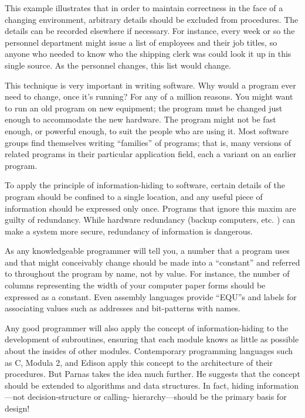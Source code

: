 This example illustrates that in order to maintain correctness in
the face of a changing environment, arbitrary details should be excluded
from procedures. The details can be recorded elsewhere if necessary.
For instance, every week or so the personnel department might issue
a list of employees and their job titles, so anyone who needed to
know who the shipping clerk was could look it up in this single source.
As the personnel changes, this list would change.

This technique is very important in writing software. Why would a
program ever need to change, once it's running? For any of a million
reasons. You might want to run an old program on new equipment; the
program must be changed just enough to accommodate the new hardware.
The program might not be fast enough, or powerful enough, to suit
the people who are using it. Most software groups find themselves
writing {}``families'' of programs; that is, many versions of related
programs in their particular application field, each a variant on
an earlier program. 

To apply the principle of information-hiding to software, certain
details of the program should be confined to a single location, and
any useful piece of information should be expressed only once. Programs
that ignore this maxim are guilty of redundancy. While hardware redundancy
(backup computers, etc. ) can make a system more secure, redundancy
of information is dangerous.

As any knowledgeable programmer will tell you, a number that a program
uses and that might conceivably change should be made into a {}``constant''
and referred to throughout the program by name, not by value. For
instance, the number of columns representing the width of your computer
paper forms should be expressed as a constant. Even assembly languages
provide {}``EQU''s and labels for associating values such as addresses
and bit-patterns with names.

Any good programmer will also apply the concept of information-hiding
to the development of subroutines, ensuring that each module knows
as little as possible about the insides of other modules. Contemporary
programming languages such as C, Modula 2, and Edison apply this concept
to the architecture of their procedures. But Parnas takes the idea
much further. He suggests that the concept should be extended to algorithms
and data structures. In fact, hiding information---not decision-structure
or calling- hierarchy---should be the primary basis for design!


